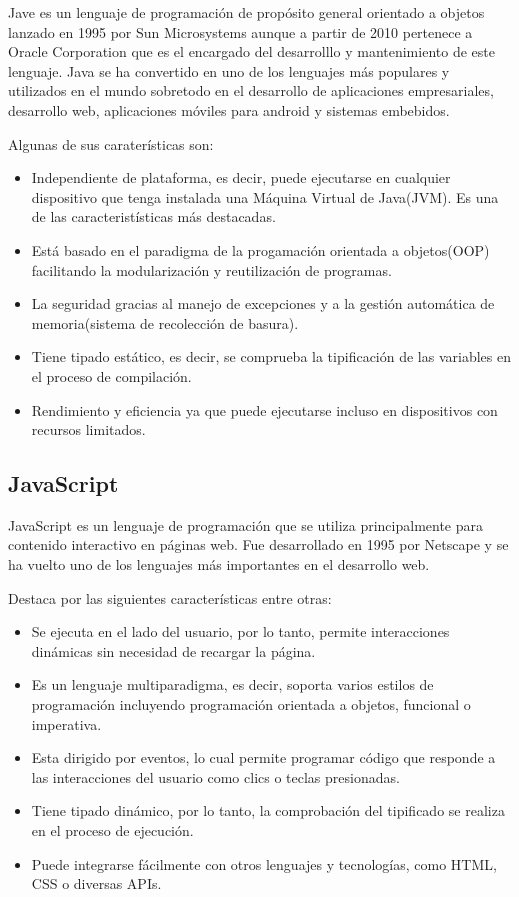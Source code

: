 Jave es un lenguaje de programación de propósito general orientado a objetos lanzado en 1995 por Sun Microsystems aunque a partir de 2010 pertenece a Oracle Corporation que es el encargado del desarrolllo y mantenimiento de este lenguaje. Java se ha convertido en uno de los lenguajes más populares y utilizados en el mundo sobretodo en el desarrollo de aplicaciones empresariales, desarrollo web, aplicaciones móviles para android y sistemas embebidos.

Algunas de sus caraterísticas son:
\begin{itemize}
    \item Independiente de plataforma, es decir, puede ejecutarse en cualquier dispositivo que tenga instalada una Máquina Virtual de Java(JVM). Es una de las caracteristísticas más destacadas.
    \item Está basado en el paradigma de la progamación orientada a objetos(OOP) facilitando la modularización y reutilización de programas.
    \item La seguridad gracias al manejo de excepciones y a la gestión automática de memoria(sistema de recolección de basura).
    \item Tiene tipado estático, es decir, se comprueba la tipificación de las variables en el proceso de compilación.
    \item Rendimiento y eficiencia ya que puede ejecutarse incluso en dispositivos con recursos limitados.
\end{itemize}

\subsection{JavaScript}

JavaScript es un lenguaje de programación que se utiliza principalmente para contenido interactivo en páginas web. Fue desarrollado en 1995 por Netscape y se ha vuelto uno de los lenguajes más importantes en el desarrollo web.

Destaca por las siguientes características entre otras:
\begin{itemize}
    \item Se ejecuta en el lado del usuario, por lo tanto, permite interacciones dinámicas sin necesidad de recargar la página.
    \item Es un lenguaje multiparadigma, es decir, soporta varios estilos de programación incluyendo programación orientada a objetos, funcional o imperativa.
    \item Esta dirigido por eventos, lo cual permite programar código que responde a las interacciones del usuario como clics o teclas presionadas.
    \item Tiene tipado dinámico, por lo tanto, la comprobación del tipificado se realiza en el proceso de ejecución.
    \item Puede integrarse fácilmente con otros lenguajes y tecnologías, como HTML, CSS o diversas APIs.
\end{itemize}

